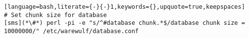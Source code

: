 \begin{lstlisting}[language=bash,literate={-}{-}1,keywords={},upquote=true,keepspaces]
# Set chunk size for database
[sms](*\#*) perl -pi -e "s/^#database chunk.*$/database chunk size = 10000000/" /etc/warewulf/database.conf
\end{lstlisting}
